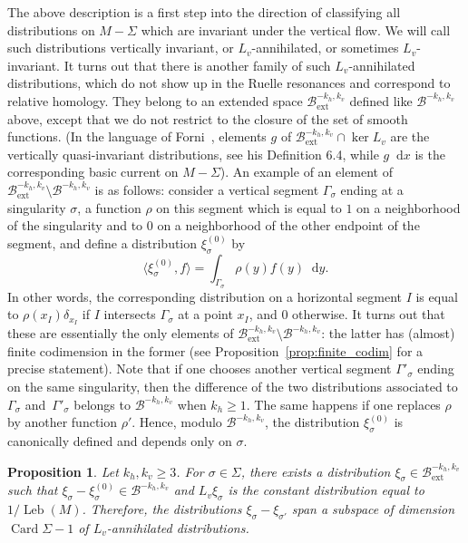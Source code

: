 \documentclass[10pt]{amsart}
\newcommand{\ext}{\mathrm{ext}}
\newcommand{\boB}{\mathcal{B}}
\newcommand{\dd}{\mathop{}\!\mathrm{d}}
\DeclareMathOperator{\Card}{Card}
\DeclareMathOperator{\Leb}{Leb}
\newtheorem{prop}[thm]{Proposition}
\theoremstyle{definition}
\numberwithin{equation}{section}
\begin{document}
The above description is a first step into the direction of classifying all
distributions on $M-\Sigma$ which are invariant under the vertical flow. We
will call such distributions vertically invariant, or $L_v$\nobreakdash-annihilated, or
sometimes $L_v$-invariant. It turns out that there is another family of such
$L_v$\nobreakdash-annihilated distributions, which do not show up in the Ruelle
resonances and correspond to relative homology. They belong to an extended
space $\boB^{-k_h, k_v}_{\ext}$ defined like $\boB^{-k_h, k_v}$ above, except
that we do not restrict to the closure of the set of smooth functions. (In
the language of Forni~\cite{forni_deviation}, elements $g$ of
$\boB_{\ext}^{-k_h, k_v} \cap \ker L_v$ are the vertically quasi-invariant
distributions, see his Definition 6.4, while $g\dd x$ is the corresponding
basic current on $M-\Sigma$). \label{page_B_ext_not_B} An example of an element of $\boB_{\ext}^{-k_h,
k_v}\setminus \boB^{-k_h, k_v}$ is as follows: consider a vertical segment
$\Gamma_\sigma$ ending at a singularity $\sigma$, a function $\rho$ on this
segment which is equal to $1$ on a neighborhood of the singularity and to $0$
on a neighborhood of the other endpoint of the segment, and define a
distribution $\xi_\sigma^{(0)}$ by
\[
\langle \xi_\sigma^{(0)}, f\rangle =
\int_{\Gamma_\sigma} \rho(y) f(y)\dd y.
\]
In other words, the corresponding
distribution on a horizontal segment $I$ is equal to $\rho(x_I) \delta_{x_I}$
if $I$ intersects $\Gamma_\sigma$ at a point $x_I$, and $0$ otherwise. It
turns out that these are essentially the only elements of $\boB_{\ext}^{-k_h,
k_v}\setminus \boB^{-k_h, k_v}$: the latter has (almost) finite codimension
in the former (see Proposition~\ref{prop:finite_codim} for a precise
statement). Note that if one chooses another vertical segment
$\Gamma'_\sigma$ ending on the same singularity, then the difference of the
two distributions associated to~$\Gamma_\sigma$ and~$\Gamma'_\sigma$ belongs
to $\boB^{-k_h, k_v}$ when $k_h \geq 1$. The same happens if one replaces
$\rho$ by another function $\rho'$. Hence, modulo $\boB^{-k_h, k_v}$, the
distribution $\xi_\sigma^{(0)}$ is canonically defined and depends only on
$\sigma$.

\begin{prop}
\label{prop:spurious_distributions} Let $k_h, k_v\geq 3$. For $\sigma \in
\Sigma$, there exists a distribution $\xi_\sigma \in \boB_{\ext}^{-k_h, k_v}$
such that $\xi_\sigma - \xi_\sigma^{(0)} \in \boB^{-k_h, k_v}$ and $L_v
\xi_\sigma$ is the constant distribution equal to $1/\Leb(M)$. Therefore, the
distributions $\xi_\sigma- \xi_{\sigma'}$ span a subspace of dimension $\Card
\Sigma- 1$ of $L_v$-annihilated distributions.
\end{prop}
\end{document}
